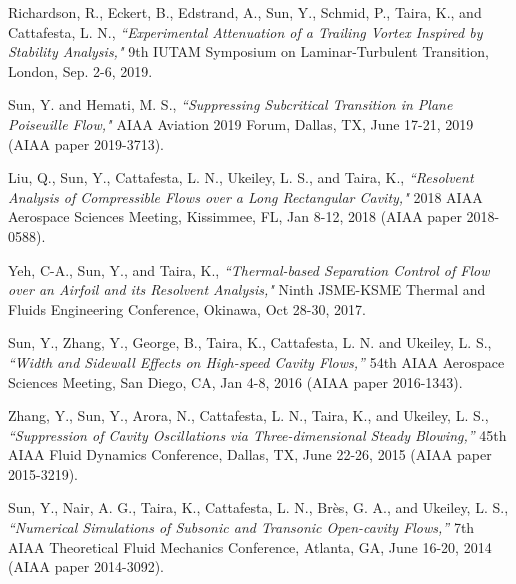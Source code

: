 \documentclass[10pt]{article}
\begin{document}
{\small
\begin{etaremune}
\item Richardson, R., Eckert, B., Edstrand, A., Sun, Y., Schmid, P., Taira, K., and Cattafesta, L. N., {\it ``Experimental Attenuation of a Trailing Vortex Inspired by Stability Analysis," } 9th IUTAM Symposium on Laminar-Turbulent Transition, London, Sep. 2-6, 2019. 

\item Sun, Y. and Hemati, M. S., {\it ``Suppressing Subcritical Transition in Plane Poiseuille Flow,"} AIAA Aviation 2019 Forum, Dallas, TX, June 17-21, 2019 (AIAA paper 2019-3713).

\item Liu, Q., Sun, Y., Cattafesta, L. N., Ukeiley, L. S., and Taira, K., {\it ``Resolvent Analysis of Compressible Flows over a Long Rectangular Cavity,"} 2018 AIAA Aerospace Sciences Meeting, Kissimmee, FL, Jan 8-12, 2018 (AIAA paper 2018-0588).

\item Yeh, C-A., Sun, Y., and Taira, K., {\it ``Thermal-based Separation Control of Flow over an Airfoil and its Resolvent Analysis,"} Ninth JSME-KSME Thermal and Fluids Engineering Conference, Okinawa, Oct 28-30, 2017.

\item Sun, Y., Zhang, Y., George, B., Taira, K., Cattafesta, L. N. and Ukeiley, L. S., {\it ``Width and Sidewall Effects on High-speed Cavity Flows,''} 54th AIAA Aerospace Sciences Meeting, San Diego, CA, Jan 4-8, 2016 (AIAA paper 2016-1343). 
 
\item Zhang, Y., Sun, Y., Arora, N., Cattafesta, L. N., Taira, K., and Ukeiley, L. S., {\it ``Suppression of Cavity Oscillations via Three-dimensional Steady Blowing,''} 45th AIAA Fluid Dynamics Conference, Dallas, TX, June 22-26, 2015 (AIAA paper 2015-3219).

\item Sun, Y., Nair, A. G., Taira, K., Cattafesta, L. N., Br\`es, G. A., and Ukeiley, L. S., {\it ``Numerical Simulations of Subsonic and Transonic Open-cavity Flows,''} 7th AIAA Theoretical Fluid Mechanics Conference, Atlanta, GA, June 16-20, 2014 (AIAA paper 2014-3092).
\end{etaremune}

}
\end{document}
